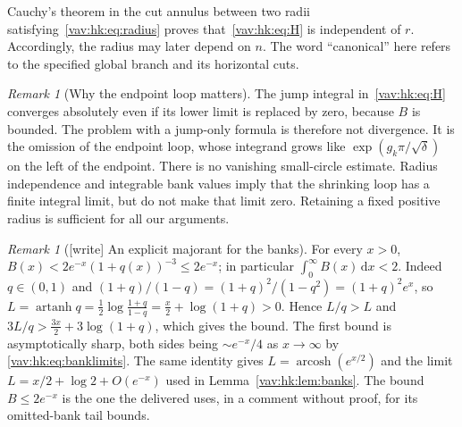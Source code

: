 \documentclass[11pt]{article}
\theoremstyle{remark}\newtheorem{remark}[theorem]{Remark}
\newcommand{\dd}{\,\mathrm d}
\newcommand{\atanh}{\operatorname{artanh}}
\newcommand{\acosh}{\operatorname{arcosh}}
\begin{document}
Cauchy's theorem in the cut annulus between two radii satisfying~\eqref{vav:hk:eq:radius} proves that~\eqref{vav:hk:eq:H} is independent of $r$. Accordingly, the radius may later depend on $n$. The word ``canonical'' here refers to the specified global branch and its horizontal cuts.

\begin{remark}[Why the endpoint loop matters]
The jump integral in~\eqref{vav:hk:eq:H} converges absolutely even if its lower limit is replaced by zero, because $B$ is bounded. The problem with a jump-only formula is therefore not divergence. It is the omission of the endpoint loop, whose integrand grows like $\exp(g_k\pi/\sqrt\delta)$ on the left of the endpoint. There is no vanishing small-circle estimate. Radius independence and integrable bank values imply that the shrinking loop has a finite integral limit, but do not make that limit zero. Retaining a fixed positive radius is sufficient for all our arguments.
\end{remark}

\begin{remark}[{[write]} An explicit majorant for the banks]\label{vav:hk:rem:bankbound}
For every $x>0$, $B(x)<2e^{-x}(1+q(x))^{-3}\le2e^{-x}$; in particular
$\int_0^\infty B(x)\dd x<2$. Indeed $q\in(0,1)$ and
$(1+q)/(1-q)=(1+q)^2/(1-q^2)=(1+q)^2e^{x}$, so
$L=\atanh q=\tfrac12\log\frac{1+q}{1-q}=\tfrac x2+\log(1+q)>0$. Hence
$L/q>L$ and $3L/q>\tfrac{3x}2+3\log(1+q)$, which gives the bound. The
first bound is asymptotically sharp, both sides being $\sim e^{-x}/4$ as
$x\to\infty$ by \eqref{vav:hk:eq:banklimits}. The same
identity gives $L=\acosh(e^{x/2})$ and the limit $L=x/2+\log2+O(e^{-x})$ used
in Lemma~\ref{vav:hk:lem:banks}. The bound $B\le2e^{-x}$ is the one the
delivered  uses, in a comment
without proof, for its omitted-bank tail bounds.
\end{remark}
\end{document}
